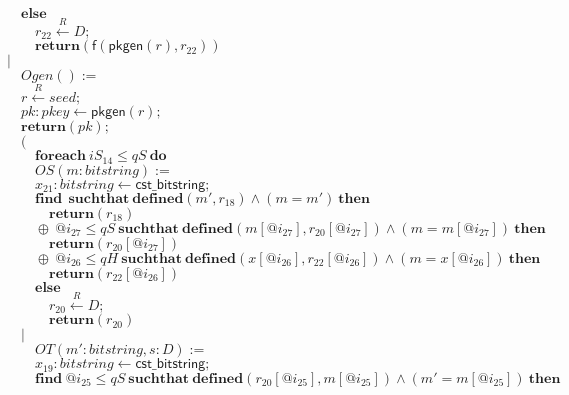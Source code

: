 \documentclass{article}
\newcommand{\store}{\leftarrow}
\newcommand{\getR}{\stackrel{R}{\store}}
\newcommand{\kw}[1]{\mathbf{#1}}
\newcommand{\kwf}[1]{\mathsf{#1}}
\newcommand{\var}[1]{\mathit{#1}}
\newcommand{\kwt}[1]{\mathit{#1}}
\newcommand{\kwp}[1]{\mathit{#1}}
\begin{document}
\begin{tabbing}
$\quad \kw{else}$\\
$\quad \quad \var{r}_{22} \getR \kwt{D};$\\
$\quad \quad \kw{return}\kwf{}(\kwf{f}(\kwf{pkgen}(\var{r}), \var{r}_{22}))$\\
$|$\\
$\quad Ogen() :=$\\
$\quad \var{r} \getR \kwt{seed};$\\
$\quad \var{pk}: \kwt{pkey} \store \kwf{pkgen}(\var{r});$\\
$\quad \kw{return}\kwf{}(\var{pk});$\\
$\quad ($\\
$\quad \quad \kw{foreach}\ \var{iS}_{14} \leq \kwp{qS}\ \kw{do}$\\
$\quad \quad OS(\var{m}: \kwt{bitstring}) :=$\\
$\quad \quad \var{x}_{21}: \kwt{bitstring} \store \kwf{cst\_bitstring};$\\
$\quad \quad \kw{find}\ \ \kw{suchthat}\ \kw{defined}(\var{m'}, \var{r}_{18})\wedge (\var{m}  =  \var{m'})\ \kw{then}$\\
$\quad \quad \quad \kw{return}\kwf{}(\var{r}_{18})$\\
$\quad \quad \oplus\ \var{@i}_{27} \leq \kwp{qS}\ \kw{suchthat}\ \kw{defined}(\var{m}[\var{@i}_{27}], \var{r}_{20}[\var{@i}_{27}])\wedge (\var{m}  =  \var{m}[\var{@i}_{27}])\ \kw{then}$\\
$\quad \quad \quad \kw{return}\kwf{}(\var{r}_{20}[\var{@i}_{27}])$\\
$\quad \quad \oplus\ \var{@i}_{26} \leq \kwp{qH}\ \kw{suchthat}\ \kw{defined}(\var{x}[\var{@i}_{26}], \var{r}_{22}[\var{@i}_{26}])\wedge (\var{m}  =  \var{x}[\var{@i}_{26}])\ \kw{then}$\\
$\quad \quad \quad \kw{return}\kwf{}(\var{r}_{22}[\var{@i}_{26}])$\\
$\quad \quad \kw{else}$\\
$\quad \quad \quad \var{r}_{20} \getR \kwt{D};$\\
$\quad \quad \quad \kw{return}\kwf{}(\var{r}_{20})$\\
$\quad |$\\
$\quad \quad OT(\var{m'}: \kwt{bitstring}, \var{s}: \kwt{D}) :=$\\
$\quad \quad \var{x}_{19}: \kwt{bitstring} \store \kwf{cst\_bitstring};$\\
$\quad \quad \kw{find}\ \var{@i}_{25} \leq \kwp{qS}\ \kw{suchthat}\ \kw{defined}(\var{r}_{20}[\var{@i}_{25}], \var{m}[\var{@i}_{25}])\wedge (\var{m'}  =  \var{m}[\var{@i}_{25}])\ \kw{then}$\\

\end{tabbing}
\end{document}
